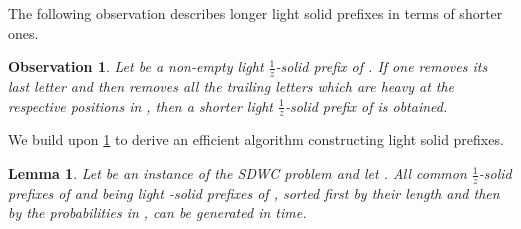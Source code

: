 \documentclass{article}
\theoremstyle{plain}
\newtheorem{lemma}[theorem]{Lemma}
\newtheorem{observation}[theorem]{Observation}
\theoremstyle{definition}
\newcommand{\SDWC}{\textsc{SDWC}\xspace}
\newcommand{\fr}{\ensuremath{\frac1z}}
\begin{document}
      The following observation describes longer light solid prefixes in terms of shorter ones.
      \begin{observation}\label{obs:light_step}
        Let  be a non-empty light \fr-solid prefix of .
        If one removes its last letter and then removes all the trailing letters which are heavy at the respective
        positions in , then a shorter light \fr-solid prefix of  is obtained.
      \end{observation}
	We build upon \cref{obs:light_step} to derive an efficient algorithm constructing light solid prefixes.\begin{lemma}\label{lem:lightprefixes_algo}
      Let  be an instance of the \SDWC problem and let .
      All common \fr-solid prefixes of  and  being light -solid prefixes of ,
      sorted first by their length and then by the probabilities in ,
      can be generated in  time.
    \end{lemma}
\end{document}
